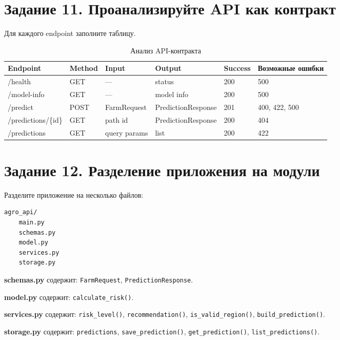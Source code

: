 \documentclass[12pt,a4paper]{article}
\begin{document}
\section{Задание 11. Проанализируйте API как контракт}

Для каждого endpoint заполните таблицу.

\begin{table}[H]
\centering
\caption{Анализ API-контракта}
\label{tab:api_contract}
\begin{tabular}{|p{3cm}|p{1.5cm}|p{2.5cm}|p{3cm}|p{1.5cm}|p{2cm}|}
\hline
\textbf{Endpoint} & \textbf{Method} & \textbf{Input} & \textbf{Output} & \textbf{Success} & \textbf{Возможные ошибки} \\
\hline
/health & GET & --- & status & 200 & 500 \\
/model-info & GET & --- & model info & 200 & 500 \\
/predict & POST & FarmRequest & PredictionResponse & 201 & 400, 422, 500 \\
/predictions/\{id\} & GET & path id & PredictionResponse & 200 & 404 \\
/predictions & GET & query params & list & 200 & 422 \\
\hline
\end{tabular}
\end{table}

\section{Задание 12. Разделение приложения на модули}

Разделите приложение на несколько файлов:

\begin{lstlisting}[language=bash, caption={Структура проекта после рефакторинга}]
agro_api/
    main.py
    schemas.py
    model.py
    services.py
    storage.py
\end{lstlisting}

\textbf{schemas.py} содержит: \texttt{FarmRequest}, \texttt{PredictionResponse}.

\textbf{model.py} содержит: \texttt{calculate\_risk()}.

\textbf{services.py} содержит: \texttt{risk\_level()}, \texttt{recommendation()}, \texttt{is\_valid\_region()}, \texttt{build\_prediction()}.

\textbf{storage.py} содержит: \texttt{predictions}, \texttt{save\_prediction()}, \texttt{get\_prediction()}, \texttt{list\_predictions()}.
\end{document}
